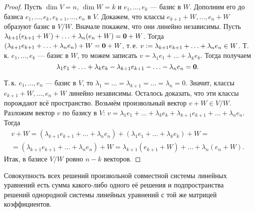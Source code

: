 \begin{proof}
    Пусть $\dim V = n$, $\dim W = k$ и $e_1, \ldots, e_k$ --- базис в $W$. Дополним его до базиса $e_1, \ldots, e_k, e_{k + 1}, \ldots, e_n$ в $V$. Докажем, что классы $e_{k + 1} + W, \ldots, e_n + W$ образуют базис в $V / W$. Вначале покажем, что они линейно независимы. Пусть $\lambda_{k + 1}(e_{k + 1} + W) + \ldots + \lambda_n(e_n + W) = \boldsymbol{0} + W$. Тогда $(\lambda_{k + 1}e_{k + 1} + \ldots + \lambda_ne_n) + W = \boldsymbol{0} + W$, т.\,е. $v \vcentcolon = \lambda_{k + 1}e_{k + 1} + \ldots + \lambda_ne_n \in W$. Т.\,к. $e_1, \ldots, e_k$ --- базис в $W$, то можем записать $v = \lambda_1e_1 + \ldots + \lambda_ke_k$. Тогда получаем
    \[
        \lambda_1e_1 + \ldots + \lambda_ke_k - \lambda_{k + 1}e_{k + 1} - \ldots - \lambda_ne_n = \boldsymbol{0}.
    \]

    Т.\,к. $e_1, \ldots, e_n$ --- базис в $V$, то $\lambda_1 = \ldots = \lambda_{k + 1} = \ldots = \lambda_n = 0$. Значит, классы $e_{k + 1} + W, \ldots, e_n + W$ линейно независимы. Осталось доказать, что эти классы порождают всё пространство. Возьмём произвольный вектор $v + W \in V / W$. Разложим вектор $v$ по базису в $V$: $v = \lambda_1e_1 + \ldots + \lambda_ke_k + \lambda_{k + 1}e_{k + 1} + \ldots + \lambda_ne_n$. Тогда
    \begin{multline*}
        v + W = (\lambda_{k + 1}e_{k + 1} + \ldots + \lambda_ne_n) + (\lambda_1e_1 + \ldots + \lambda_ke_k) + W =\\ = (\lambda_{k + 1}e_{k + 1} + \ldots + \lambda_ne_n) + W = \lambda_{k + 1}(e_{k + 1} + W) + \ldots + \lambda_n(e_n + W).
    \end{multline*}
    Итак, в базисе $V / W$ ровно $n - k$ векторов.
\end{proof}

\begin{proposal}
    Совокупность всех решений произвольной совместной системы линейных уравнений есть сумма какого-либо одного её решения и подпространства решений однородной системы линейных уравнений с той же матрицей коэффициентов.
\end{proposal}

